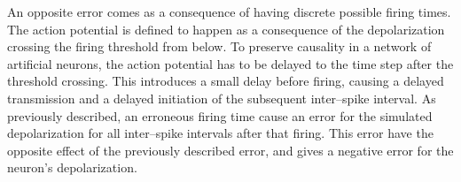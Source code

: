 	
		An opposite error comes as a consequence of having discrete possible firing times.
		The action potential is defined to happen as a consequence of the depolarization crossing the firing threshold from below.
		To preserve causality in a network of artificial neurons, the action potential has to be delayed to the time step after the threshold crossing.
		This introduces a small delay before firing, causing a delayed transmission and a delayed initiation of the subsequent inter--spike interval.
		As previously described, an erroneous firing time cause an error for the simulated depolarization for all inter--spike intervals after that firing.
		This error have the opposite effect of the previously described error, and gives a negative error for the neuron's depolarization.




